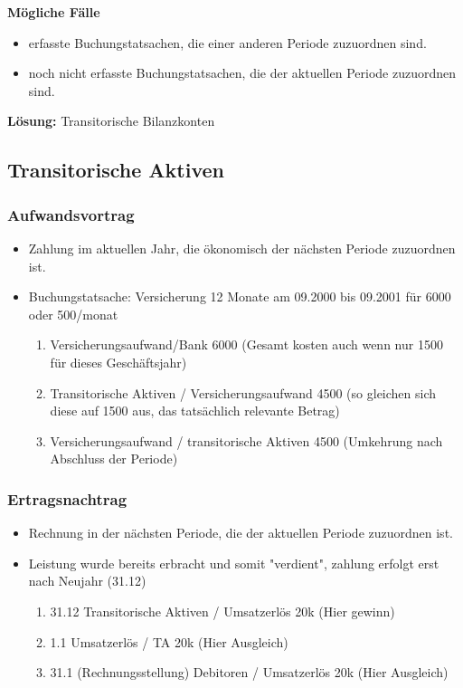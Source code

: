 \textbf{Mögliche Fälle}
\begin{itemize}
    \item erfasste Buchungstatsachen, die einer anderen Periode zuzuordnen sind.
    \item noch nicht erfasste Buchungstatsachen, die der aktuellen Periode zuzuordnen sind.
\end{itemize}

\textbf{Lösung:} Transitorische Bilanzkonten 
\subsection{Transitorische Aktiven}
\subsubsection{Aufwandsvortrag} 
    \begin{itemize}
        \item Zahlung im aktuellen Jahr, die ökonomisch der nächsten Periode zuzuordnen ist.
        \item Buchungstatsache: Versicherung 12 Monate am 09.2000 bis 09.2001 für 6000 oder 500/monat
        \begin{enumerate}
            \item Versicherungsaufwand/Bank 6000 (Gesamt kosten auch wenn nur 1500 für dieses Geschäftsjahr)
            \item Transitorische Aktiven / Versicherungsaufwand  4500 (so gleichen sich diese auf 1500 aus, das tatsächlich relevante Betrag)
            \item Versicherungsaufwand / transitorische Aktiven  4500 (Umkehrung nach Abschluss der Periode)
        \end{enumerate}
    \end{itemize}
    
\subsubsection{Ertragsnachtrag}
    \begin{itemize}
        \item Rechnung in der nächsten Periode, die der aktuellen Periode zuzuordnen ist.
        \item Leistung wurde bereits erbracht und somit "verdient", zahlung erfolgt erst nach Neujahr (31.12) 
        \begin{enumerate}
            \item 31.12  Transitorische Aktiven / Umsatzerlös 20k (Hier gewinn)
            \item 1.1 Umsatzerlös / TA 20k (Hier Ausgleich)
            \item 31.1 (Rechnungsstellung) Debitoren / Umsatzerlös 20k (Hier Ausgleich)
        \end{enumerate}
    \end{itemize}
